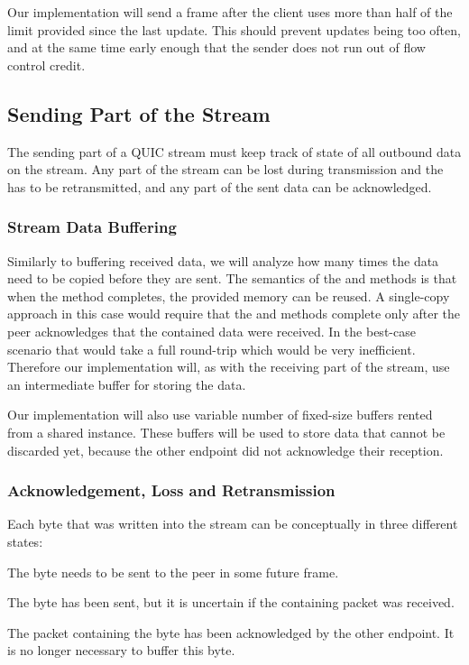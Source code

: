 Our implementation will send a \MAXSTREAMDATA{} frame after the client uses more than half of the
limit provided since the last update. This should prevent updates being too often, and at
the same time early enough that the sender does not run out of flow control credit.

\subsection{Sending Part of the Stream}

The sending part of a QUIC stream must keep track of state of all outbound data on the stream. Any
part of the stream can be lost during transmission and the has to be retransmitted, and any part of
the sent data can be acknowledged.

\subsubsection{Stream Data Buffering}

Similarly to buffering received data, we will analyze how many times the data need to be copied
before they are sent. The semantics of the  and  methods is that
when the method completes, the provided memory can be reused.  A
single-copy approach in this case would require that the  and 
methods complete only after the peer acknowledges that the contained data were received. In the
best-case scenario that would take a full round-trip which would be very inefficient. Therefore our
implementation will, as with the receiving part of the stream, use an intermediate buffer for
storing the data.

Our implementation will also use variable number of fixed-size buffers rented from a shared
 instance. These buffers will be used to store data that cannot be discarded
yet, because the other endpoint did not acknowledge their reception.

\subsubsection{Acknowledgement, Loss and Retransmission}

Each byte that was written into the stream can be conceptually in three different states:

\begin{itemize}

   The byte needs to be sent to the peer in some future \STREAM{} frame.

   The byte has been sent, but it is uncertain if the containing packet was
received.

   The packet containing the byte has been acknowledged by the other endpoint. It is no longer necessary to buffer this byte.

\end{itemize}

